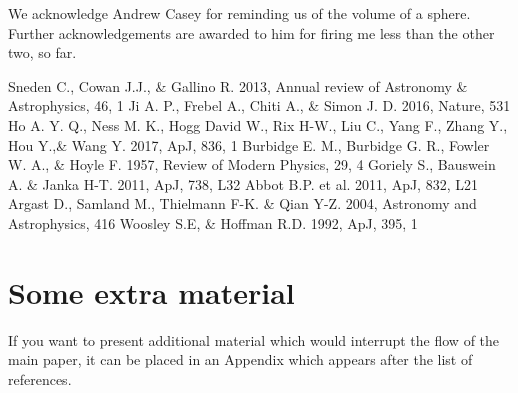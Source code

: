 \documentclass[a4paper,fleqn,usenatbib]{mnras}
\begin{document}
	We acknowledge Andrew Casey for reminding us of the volume of a sphere. Further acknowledgements are awarded to him for firing me less than the other two, so far.
	
	
	
	
	\begin{thebibliography}{99}
		Sneden C., Cowan J.J., \& Gallino R. 2013, Annual review of Astronomy \& Astrophysics, 46, 1
		Ji A. P., Frebel A., Chiti A., \& Simon J. D. 2016, Nature, 531
		Ho A. Y. Q., Ness M. K., Hogg David W., Rix H-W., Liu C., Yang F., Zhang Y., Hou Y.,\& Wang Y. 2017, ApJ, 836, 1
		Burbidge E. M., Burbidge G. R., Fowler W. A., \& Hoyle F. 1957, Review of Modern Physics, 29, 4
		Goriely S., Bauswein A. \& Janka H-T. 2011, ApJ, 738, L32
		Abbot B.P. et al. 2011, ApJ, 832, L21
		Argast D., Samland M., Thielmann F-K. \& Qian Y-Z. 2004, Astronomy and Astrophysics, 416
		Woosley S.E, \& Hoffman R.D. 1992, ApJ, 395, 1
	\end{thebibliography}
	
	
	
	\appendix
	\section{Some extra material}
	
	If you want to present additional material which would interrupt the flow of the main paper,
	it can be placed in an Appendix which appears after the list of references.
	
\end{document}
